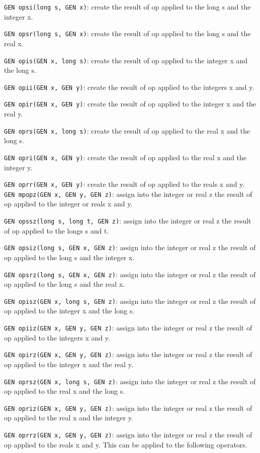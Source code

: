 {\tt GEN opsi(long s, GEN x)}: create the result of op applied to the long s
and the integer x.

{\tt GEN opsr(long s, GEN x)}: create the result of op applied to the long s
and the real x.

{\tt GEN opis(GEN x, long s)}: create the result of op applied to the integer x
and the long s.

{\tt GEN opii(GEN x, GEN y)}: create the result of op applied to the integers x
and y.

{\tt GEN opir(GEN x, GEN y)}: create the result of op applied to the integer x
and the real y.

{\tt GEN oprs(GEN x, long s)}: create the result of op applied to the real x
and the long s.

{\tt GEN opri(GEN x, GEN y)}: create the result of op applied to the real x
and the integer y.

{\tt GEN oprr(GEN x, GEN y)}: create the result of op applied to the reals x
and y.
\smallskip
{\tt GEN mpopz(GEN x, GEN y, GEN z)}: assign into the integer or real z
the result of op applied to the integer or reals x and y.

{\tt GEN opssz(long s, long t, GEN z)}: assign into the integer or real z
the result of op applied to the longs s and t.

{\tt GEN opsiz(long s, GEN x, GEN z)}: assign into the integer or real z
the result of op applied to the long s and the integer x.

{\tt GEN opsrz(long s, GEN x, GEN z)}: assign into the integer or real z
the result of op applied to the long s and the real x.

{\tt GEN opisz(GEN x, long s, GEN z)}: assign into the integer or real z
the result of op applied to the integer x and the long s.

{\tt GEN opiiz(GEN x, GEN y, GEN z)}: assign into the integer or real z
the result of op applied to the integers x and y.

{\tt GEN opirz(GEN x, GEN y, GEN z)}: assign into the integer or real z
the result of op applied to the integer x and the real y.

{\tt GEN oprsz(GEN x, long s, GEN z)}: assign into the integer or real z
the result of op applied to the real x and the long s.

{\tt GEN opriz(GEN x, GEN y, GEN z)}: assign into the integer or real z
the result of op applied to the real x and the integer y.

{\tt GEN oprrz(GEN x, GEN y, GEN z)}: assign into the integer or real z
the result of op applied to the reals x and y.
\smallskip
This can be applied to the following operators.

